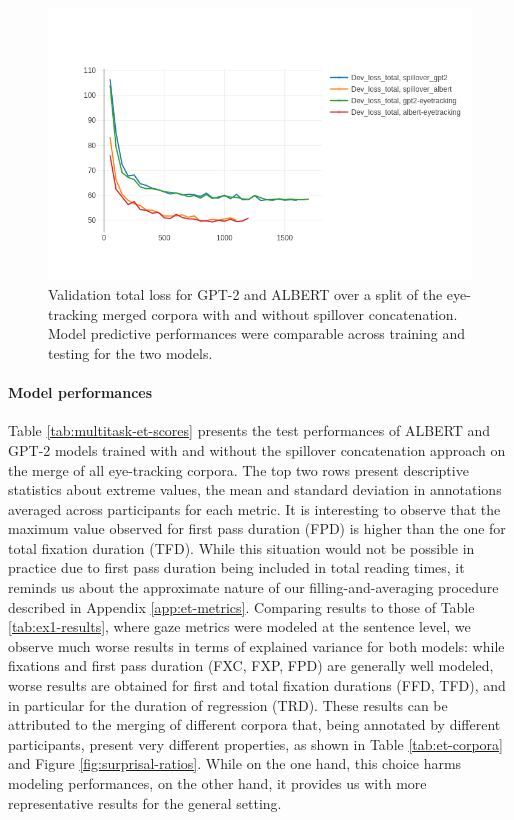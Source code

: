 \documentclass[a4paper, nobind]{templates/ociamthesis}
\begin{document}
\begin{figure}

{\centering \includegraphics[width=0.7\linewidth]{figures/appendix/A3_spillover_training} 

}

\caption{Validation total loss for GPT-2 and ALBERT over a split of the eye-tracking merged corpora with and without spillover concatenation. Model predictive performances were comparable across training and testing for the two models.}\label{fig:spillover-training}
\end{figure}

\paragraph{Model performances} Table \ref{tab:multitask-et-scores} presents the test performances of ALBERT and GPT-2 models trained with and without the spillover concatenation approach on the merge of all eye-tracking corpora. The top two rows present descriptive statistics about extreme values, the mean and standard deviation in annotations averaged across participants for each metric. It is interesting to observe that the maximum value observed for first pass duration (FPD) is higher than the one for total fixation duration (TFD). While this situation would not be possible in practice due to first pass duration being included in total reading times, it reminds us about the approximate nature of our filling-and-averaging procedure described in Appendix \ref{app:et-metrics}. Comparing results to those of Table \ref{tab:ex1-results}, where gaze metrics were modeled at the sentence level, we observe much worse results in terms of explained variance for both models: while fixations and first pass duration (FXC, FXP, FPD) are generally well modeled, worse results are obtained for first and total fixation durations (FFD, TFD), and in particular for the duration of regression (TRD). These results can be attributed to the merging of different corpora that, being annotated by different participants, present very different properties, as shown in Table \ref{tab:et-corpora} and Figure \ref{fig:surprisal-ratios}. While on the one hand, this choice harms modeling performances, on the other hand, it provides us with more representative results for the general setting.
\end{document}
